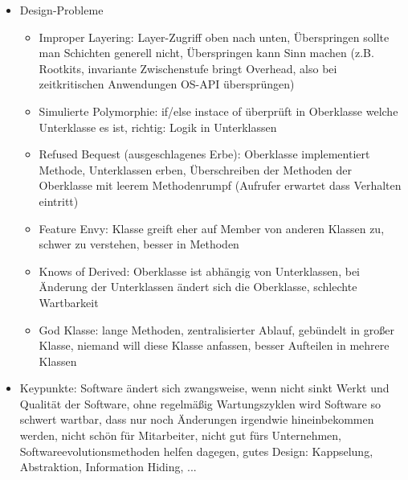 \documentclass[paper=a4, fontsize=11pt]{scrartcl} %
\numberwithin{equation}{section} %
\numberwithin{figure}{section} %
\numberwithin{table}{section} %
\begin{document}
\begin{itemize}
  \item Design-Probleme
  \begin{itemize}
    \item Improper Layering: Layer-Zugriff oben nach unten, Überspringen sollte man Schichten generell nicht, Überspringen kann Sinn machen (z.B. Rootkits, invariante Zwischenstufe bringt Overhead, also bei zeitkritischen Anwendungen OS-API übersprüngen)
    \item Simulierte Polymorphie: if/else instace of überprüft in Oberklasse welche Unterklasse es ist, richtig: Logik in Unterklassen
    \item Refused Bequest (ausgeschlagenes Erbe): Oberklasse implementiert Methode, Unterklassen erben, Überschreiben der Methoden der Oberklasse mit leerem Methodenrumpf (Aufrufer erwartet dass Verhalten eintritt)
    \item Feature Envy: Klasse greift eher auf Member von anderen Klassen zu, schwer zu verstehen, besser in Methoden
    \item Knows of Derived: Oberklasse ist abhängig von Unterklassen, bei Änderung der Unterklassen ändert sich die Oberklasse, schlechte Wartbarkeit
    \item God Klasse: lange Methoden, zentralisierter Ablauf, gebündelt in großer Klasse, niemand will diese Klasse anfassen, besser Aufteilen in mehrere Klassen
  \end{itemize}
  \item Keypunkte: Software ändert sich zwangsweise, wenn nicht sinkt Werkt und Qualität der Software, ohne regelmäßig Wartungszyklen wird Software so schwert wartbar, dass nur noch Änderungen irgendwie hineinbekommen werden, nicht schön für Mitarbeiter, nicht gut fürs Unternehmen, Softwareevolutionsmethoden helfen dagegen, gutes Design: Kappselung, Abstraktion, Information Hiding, ... 
\end{itemize}
\end{document}
